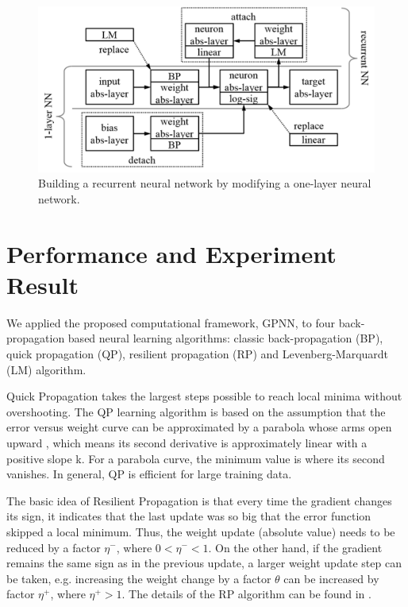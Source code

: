 \documentclass[procedia]{easychair}
\begin{document}
\begin{figure}[h]
    \begin{centering}
        \includegraphics[scale=0.5]{../pic/reusability.png}
        \caption{Building a recurrent neural network by modifying a one-layer neural network.}
        \label{fig:reusability}
	\end{centering}
\end{figure}


\section{Performance and Experiment Result}
\label{section:performance}

We applied the proposed computational framework, GPNN, to four back-propagation based neural learning algorithms: classic back-propagation (BP), quick propagation (QP), resilient propagation (RP) and Levenberg-Marquardt (LM) algorithm.

Quick Propagation takes the largest steps possible to reach local minima without overshooting.  The QP learning algorithm is based on the assumption that the error versus weight curve can be approximated by a parabola whose arms open upward \cite{fahlman1988empirical}, which means its second derivative is approximately linear with a positive slope k.  For a parabola curve, the minimum value is where its second vanishes.  In general, QP is efficient for large training data.

The basic idea of Resilient Propagation is that every time the gradient changes its sign, it indicates that the last update was so big that the error function skipped a local minimum.  Thus, the weight update (absolute value) needs to be reduced by a factor $ \eta ^ - $, where $ 0 < \eta ^ - < 1 $.  On the other hand, if the gradient remains the same sign as in the previous update, a larger weight update step can be taken, e.g. increasing the weight change by a factor $\theta$ can be increased by factor  $ \eta ^ + $, where $ \eta ^ + > 1 $.  The details of the RP algorithm can be found in \cite{riedmiller1993direct}.
\end{document}
